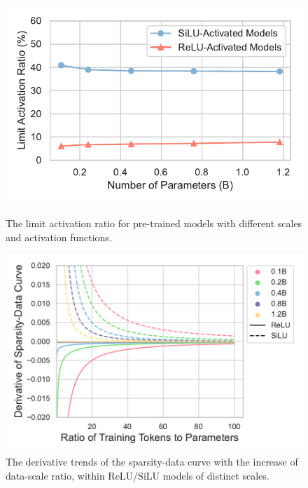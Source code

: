 \documentclass{article} %
\begin{document}
\begin{figure}[ht]
\begin{minipage}[c]{0.48\linewidth}
    \centering
    \includegraphics[width=\linewidth]{figures/scale-sparsity.pdf}
    \caption{The limit activation ratio for pre-trained models with different scales and activation functions.}
    \label{fig:scale-sparsity}
\end{minipage}
\hfill
\begin{minipage}[c]{0.48\linewidth}
    \centering
    \includegraphics[width=\linewidth]{figures/derivative.pdf}
    \caption{The derivative trends of the sparsity-data curve with the increase of data-scale ratio, within ReLU/SiLU models of distinct scales.}
    \label{fig:relu-derivative}
\end{minipage}
\vspace{-1em}
\end{figure}
\end{document}
